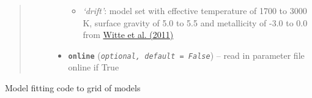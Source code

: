 \documentclass[letterpaper,10pt,english]{sphinxmanual}
\begin{document}
\begin{fulllineitems}
\begin{quote}
\begin{description}
\begin{itemize}
\begin{itemize}
\item {} 
\emph{`drift'}: model set with effective temperature of 1700 to 3000 K, surface gravity of 5.0 to 5.5 and metallicity of -3.0 to 0.0
from \href{http://adsabs.harvard.edu/abs/2011A\%26A...529A..44W}{Witte et al. (2011)}

\end{itemize}


\item {} 
\textbf{\texttt{online}} (\emph{\texttt{optional, default = False}}) -- read in parameter file online if True

\end{itemize}

\end{description}\end{quote}

\end{fulllineitems}


\begin{fulllineitems}
\label{splat_model:splat_model.modelFitGrid}
Model fitting code to grid of models

\end{fulllineitems}

\end{document}

